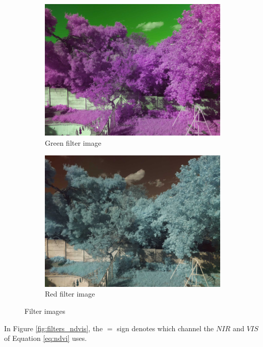 \begin{appendices}
\begin{figure}[H]
\begin{subfigure}{0.5\textwidth}
\includegraphics[scale=0.17]{filter/green_ir.jpg}
\caption{Green filter image}
\end{subfigure}
\begin{subfigure}{0.5\textwidth}
\centering
\includegraphics[scale=0.17]{filter/red_ir.jpg}
\caption{Red filter image}
\end{subfigure}
\caption{Filter images}
\label{fig:filters}
\end{figure}

In Figure \ref{fig:filters_ndvis}, the $=$ sign denotes which channel the $NIR$ and $VIS$ of Equation \ref{eq:ndvi} uses.


\end{appendices}
